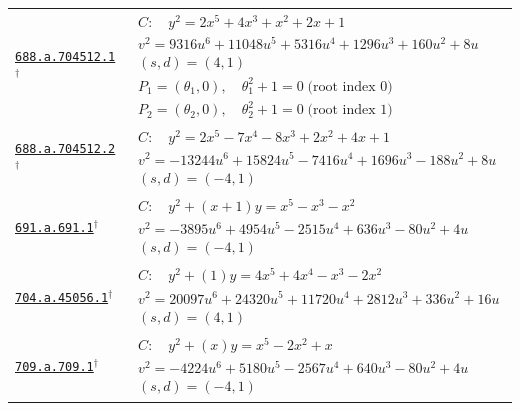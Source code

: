 \documentclass[10pt]{article}
\newcommand{\entryseparator}{\noalign{\vskip3pt\hbox to\linewidth{\leaders\hbox{\kern2pt\rule{3pt}{0.3pt}\kern2pt}\hfill}\nobreak\vskip3pt\nobreak}}
\begin{document}
\begin{landscape}
\begin{longtable}{@{}p{3.4cm}p{\dimexpr\linewidth-3.4cm-2\tabcolsep\relax}@{}}
\entryseparator
\href{https://www.lmfdb.org/Genus2Curve/Q/688/a/704512/1}{\texttt{688.a.704512.1}}$^{\dagger}$ & $\begin{gathered}C:\quad y^2=2 x^{5} + 4 x^{3} + x^{2} + 2 x + 1\\v^2=9316 u^{6} + 11048 u^{5} + 5316 u^{4} + 1296 u^{3} + 160 u^{2} + 8 u\\(s,d)=(4,1)\\P_{1}=\left(\theta_{1},0\right),\quad \theta_{1}^{2} + 1=0\;\text{(root index 0)}\\P_{2}=\left(\theta_{2},0\right),\quad \theta_{2}^{2} + 1=0\;\text{(root index 1)}\end{gathered}$ \\
\entryseparator
\href{https://www.lmfdb.org/Genus2Curve/Q/688/a/704512/2}{\texttt{688.a.704512.2}}$^{\dagger}$ & $\begin{gathered}C:\quad y^2=2 x^{5} - 7 x^{4} - 8 x^{3} + 2 x^{2} + 4 x + 1\\v^2=-13244 u^{6} + 15824 u^{5} - 7416 u^{4} + 1696 u^{3} - 188 u^{2} + 8 u\\(s,d)=(-4,1)\end{gathered}$ \\
\entryseparator
\href{https://www.lmfdb.org/Genus2Curve/Q/691/a/691/1}{\texttt{691.a.691.1}}$^{\dagger}$ & $\begin{gathered}C:\quad y^2+\left(x + 1\right)y=x^{5} - x^{3} - x^{2}\\v^2=-3895 u^{6} + 4954 u^{5} - 2515 u^{4} + 636 u^{3} - 80 u^{2} + 4 u\\(s,d)=(-4,1)\end{gathered}$ \\
\entryseparator
\href{https://www.lmfdb.org/Genus2Curve/Q/704/a/45056/1}{\texttt{704.a.45056.1}}$^{\dagger}$ & $\begin{gathered}C:\quad y^2+\left(1\right)y=4 x^{5} + 4 x^{4} - x^{3} - 2 x^{2}\\v^2=20097 u^{6} + 24320 u^{5} + 11720 u^{4} + 2812 u^{3} + 336 u^{2} + 16 u\\(s,d)=(4,1)\end{gathered}$ \\
\entryseparator
\href{https://www.lmfdb.org/Genus2Curve/Q/709/a/709/1}{\texttt{709.a.709.1}}$^{\dagger}$ & $\begin{gathered}C:\quad y^2+\left(x\right)y=x^{5} - 2 x^{2} + x\\v^2=-4224 u^{6} + 5180 u^{5} - 2567 u^{4} + 640 u^{3} - 80 u^{2} + 4 u\\(s,d)=(-4,1)\end{gathered}$ \\

\end{longtable}
\end{landscape}
\end{document}
